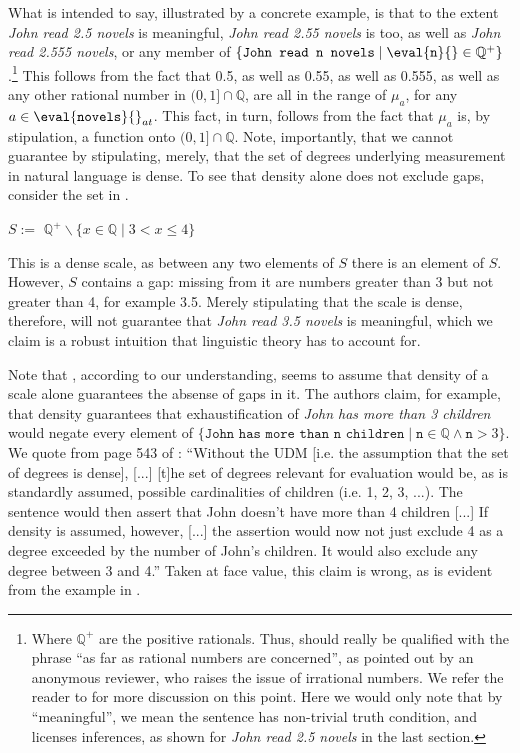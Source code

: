 \documentclass[output=paper]{langscibook}
\begin{document}
\noindent What  is intended to say, illustrated by a concrete example, is that to the extent \textit{John read 2.5 novels} is meaningful, \textit{John read 2.55 novels} is too, as well as \textit{John read 2.555 novels}, or any member of $\{\texttt{John read n novels} \mid \eval{\texttt{n}}{} \in \mathbb{Q}^+\}$.\footnote{Where $\mathbb{Q}^+$ are the positive rationals. Thus,  should really be qualified with the phrase ``as far as rational numbers are concerned'', as pointed out by an anonymous reviewer, who raises the issue of irrational numbers. We refer the reader to  for more discussion on this point. Here we would only note that by ``meaningful'', we mean the sentence has non-trivial truth condition, and licenses inferences, as shown for \textit{John read 2.5 novels} in the last section.} This follows from the fact that 0.5, as well as 0.55, as well as 0.555, as well as any other rational number in $(0,1] \cap\mathbb{Q}$, are all in the range of $\mu_a$, for any $a \in \eval{\texttt{novels}}{}_{at}$. This fact, in turn, follows from the fact that $\mu_a$ is, by stipulation, a function onto $(0,1] \cap\mathbb{Q}$. Note, importantly, that we cannot guarantee  by stipulating, merely, that the set of degrees underlying measurement in natural language is dense. To see that density alone does not exclude gaps, consider the set in .

\ea  
$S :=$ $\mathbb{Q}^+ \backslash \{x \in \mathbb{Q} \mid 3 < x \leq 4\}$
\label{hai-tri:dense+gap}
\z

\noindent This is a dense scale, as between any two elements of $S$ there is an element of $S$. However, $S$ contains a gap: missing from it are numbers greater than 3 but not greater than 4, for example 3.5. Merely stipulating that the scale is dense, therefore, will not guarantee that \textit{John read 3.5 novels} is meaningful, which we claim is a robust intuition that linguistic theory has to account for.

Note that \citet{foxhackl2006universal}, according to our understanding, seems to assume that density of a scale alone guarantees the absense of gaps in it. The authors claim, for example, that density guarantees that exhaustification of \textit{John has more than 3 children} would negate every element of $\{\texttt{John has more than n children} \mid \texttt{n} \in \mathbb{Q} \wedge \texttt{n} > 3\}$. We quote from page 543 of \citet{foxhackl2006universal}: ``Without the UDM [i.e. the assumption that the set of degrees is dense], [...] [t]he set of degrees relevant for evaluation would be, as is standardly assumed, possible cardinalities of children (i.e. 1, 2, 3, ...). The sentence would then assert that John doesn't have more than 4 children [...] If density is assumed, however, [...] the assertion would now not just exclude 4 as a degree exceeded by the number of John’s children. It would also exclude any degree between 3 and 4.'' Taken at face value, this claim is wrong, as is evident from the example in . %
\end{document}
